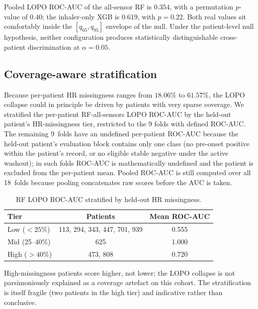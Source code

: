\documentclass[11pt,a4paper]{article}
\newcommand{\rocauc}{ROC\nobreakdash-AUC}
\begin{document}
Pooled LOPO \rocauc{} of the all-sensor RF is $0.354$, with a
permutation $p$-value of $0.40$; the inhaler-only XGB is $0.619$,
with $p=0.22$.  Both real values sit comfortably inside the
$[q_{05},q_{95}]$ envelope of the null.  Under the patient-level
null hypothesis, neither configuration produces statistically
distinguishable cross-patient discrimination at $\alpha=0.05$.

\subsection{Coverage-aware stratification}\label{sec:results-coverage}

Because per-patient HR missingness ranges from $18.06\%$ to
$61.57\%$, the LOPO collapse could in principle be driven by
patients with very sparse coverage.  We stratified the per-patient
RF-all-sensors LOPO \rocauc{} by the held-out patient's
HR-missingness tier, restricted to the 9 folds with defined
\rocauc{}.  The remaining 9~folds have an undefined per-patient
\rocauc{} because the held-out patient's evaluation block contains
only one class (no pre-onset positive within the patient's record,
or no eligible stable negative under the active washout); in such
folds \rocauc{} is mathematically undefined and the patient is
excluded from the per-patient mean.  Pooled \rocauc{} is still
computed over all 18~folds because pooling concatenates raw scores
before the AUC is taken.

\begin{table}[H]
\centering
\caption{RF LOPO \rocauc{} stratified by held-out HR missingness.}
\label{tab:lopo-coverage}
\small
\begin{tabular}{lcc}
\toprule
\textbf{Tier} & \textbf{Patients} & \textbf{Mean \rocauc{}} \\
\midrule
Low ($<25\%$)   & 113, 294, 343, 447, 701, 939 & 0.555 \\
Mid (25--40\%)  & 625                          & 1.000 \\
High ($>40\%$)  & 473, 808                     & 0.720 \\
\bottomrule
\end{tabular}
\end{table}

High-missingness patients score higher, not lower; the LOPO
collapse is not parsimoniously explained as a coverage artefact on
this cohort.  The stratification is itself fragile (two patients in
the high tier) and indicative rather than conclusive.
\end{document}
